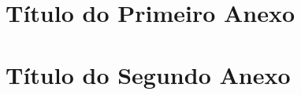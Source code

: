 \begin{anexosenv}
  \chapter{Título do Primeiro Anexo} %
  \label{cha:Título do Primeiro Anexo}
  

  \chapter{Título do Segundo Anexo} %
  \label{cha:Título do Segundo Anexo}
  
\end{anexosenv}

